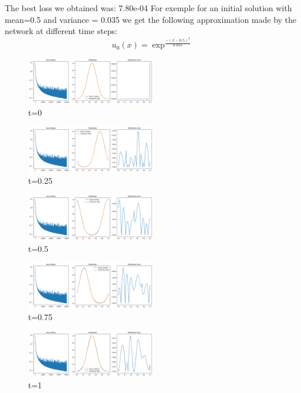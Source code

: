 \documentclass{article}
\begin{document}
The best loss we obtained was: 7.80e-04 
For exemple for an initial solution with mean=0.5 and variance = 0.035 we get the following approximation made by the network at different time steps:\\
\begin{equation*}
    u_0(x) = \exp^{\frac{-(x-0.5)^2}{0.035}}
\end{equation*}

\begin{figure}[!h]
    \centering
    \includegraphics[width=0.5\textwidth]{images/r1.png}
    \caption{t=0}
\end{figure}

\begin{figure}[!h]
    \centering
    \includegraphics[width=0.5\textwidth]{images/r2.png}
    \caption{t=0.25}
\end{figure}

\begin{figure}[!h]
    \centering
    \includegraphics[width=0.5\textwidth]{images/r3.png}
    \caption{t=0.5}
\end{figure}

\begin{figure}[!h]
    \centering
    \includegraphics[width=0.5\textwidth]{images/r4.png}
    \caption{t=0.75}
\end{figure}

\begin{figure}[!h]
    \centering
    \includegraphics[width=0.5\textwidth]{images/r5.png}
    \caption{t=1}
\end{figure}
\end{document}
